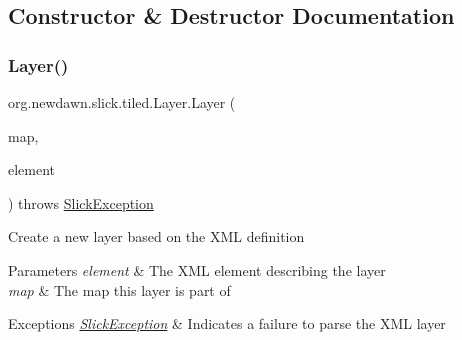 \subsection{Constructor \& Destructor Documentation}
\mbox{\label{classorg_1_1newdawn_1_1slick_1_1tiled_1_1_layer_ad70b6189c60a0f7d1ca336d7febff1a0}} 
\subsubsection{\texorpdfstring{Layer()}{Layer()}}
{\footnotesize\ttfamily org.\+newdawn.\+slick.\+tiled.\+Layer.\+Layer (\begin{DoxyParamCaption}\item[{\mbox{\hyperlink{classorg_1_1newdawn_1_1slick_1_1tiled_1_1_tiled_map}{Tiled\+Map}}}]{map,  }\item[{Element}]{element }\end{DoxyParamCaption}) throws \mbox{\hyperlink{classorg_1_1newdawn_1_1slick_1_1_slick_exception}{Slick\+Exception}}\hspace{0.3cm}{\ttfamily [inline]}}

Create a new layer based on the X\+ML definition


\begin{DoxyParams}{Parameters}
{\em element} & The X\+ML element describing the layer \\
\hline
{\em map} & The map this layer is part of \\
\hline
\end{DoxyParams}

\begin{DoxyExceptions}{Exceptions}
{\em \mbox{\hyperlink{classorg_1_1newdawn_1_1slick_1_1_slick_exception}{Slick\+Exception}}} & Indicates a failure to parse the X\+ML layer \\
\hline
\end{DoxyExceptions}

